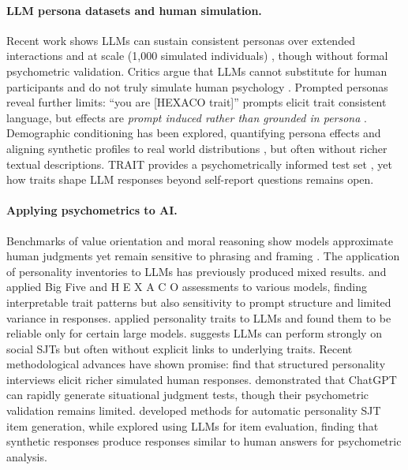 \documentclass[11pt]{article}
\newcommand{\hexaco}{%
  {\textcolor{hexH}{H}}%
  {\textcolor{hexE}{E}}%
  {\textcolor{hexX}{X}}%
  {\textcolor{hexA}{A}}%
  {\textcolor{hexC}{C}}%
  {\textcolor{hexO}{O}}%
}
\begin{document}
\paragraph{LLM persona datasets and human simulation.}

Recent work shows LLMs can sustain consistent personas over extended interactions \citep{park2023generative} and at scale (1{,}000 simulated individuals) \citep{park2024generative}, though without formal psychometric validation. Critics argue that LLMs cannot substitute for human participants and do not truly simulate human psychology \citep{problem_research_participants_2,problem_reword}. Prompted personas reveal further limits: “you are [HEXACO trait]” prompts elicit trait consistent language, but effects are \emph{prompt induced rather than grounded in persona} \citep{jiang-etal-2024-personallm}. Demographic conditioning has been explored, quantifying persona effects \citep{hu-collier-2024-quantifying} and aligning synthetic profiles to real world distributions \citep{personas_nemotron_personas}, but often without richer textual descriptions. TRAIT provides a psychometrically informed test set \citep{lee2025llms}, yet how traits shape LLM responses beyond self-report questions remains open.

\paragraph{Applying psychometrics to AI.}
Benchmarks of value orientation and moral reasoning show models approximate human judgments yet remain sensitive to phrasing and framing \cite{ren-etal-2024-valuebench}. The application of personality inventories to LLMs has previously produced mixed results. \citet{lu2023illuminating} and \citet{pellert2024ai} applied Big Five and \hexaco\;  assessments to various models, finding interpretable trait patterns but also sensitivity to prompt structure and limited variance in responses.  \citet{serapio2025psychometric} applied personality traits to LLMs and found them to be reliable only for certain large models. \citet{mittelstadt2024large} suggests LLMs can perform strongly on social SJTs but often without explicit links to underlying traits. Recent methodological advances have shown promise: \citet{wang2025personality} find that structured personality interviews elicit richer simulated human responses.
\citet{krumm2024creating} demonstrated that ChatGPT can rapidly generate situational judgment tests, though their psychometric validation remains limited. \citet{li2024automatic} developed methods for automatic personality SJT item generation, while \citet{liu2025leveraging} explored using LLMs for item evaluation, finding that synthetic responses produce responses similar to human answers for psychometric analysis.
\end{document}
